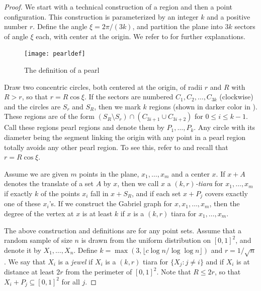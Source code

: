 \documentclass[lotsofwhite,charterfonts]{patmorin}
\begin{document}
\begin{proof}
We start with a technical construction of a region and then a point
configuration.  This construction is parameterized by an integer $k$
and a positive number $r$.  Define the angle $\xi = 2\pi / (3k)$, and
partition the plane into $3k$ sectors of angle $\xi$ each, with center
at the origin.  We refer to  for further explanations.

\begin{figure}[htbp]
\begin{center}\texttt{[image: pearldef]}\end{center}
\caption{The definition of a pearl}
\end{figure}

Draw two concentric circles, both centered at the origin, of radii $r$
and $R$ with $R > r$, so that $r = R \cos \xi$.  If the sectors are
numbered $C_1, C_2, \ldots, C_{3k}$ (clockwise) and the circles are
$S_r$ and $S_R$, then we mark $k$ regions (shown in darker color in
). These regions are of the form $(S_R \setminus S_r) \cap
(C_{3i+1} \cup C_{3i+2})$ for $0 \le i \le k-1$.  Call these regions
pearl regions and denote them by $P_1 , \ldots, P_k$.  Any circle with
its diameter being the segment linking the origin with any point in a
pearl region totally avoids any other pearl region. To see this, refer
to  and recall that $r = R \cos \xi$.

Assume we are given $m$ points in the plane, $x_1,\ldots,x_m$ and a
center $x$.  If $x+A$ denotes the translate of a set $A$ by $x$, then we
call $x$ a \emph{$(k,r)$-tiara} for $x_1 , \ldots , x_m$ if exactly $k$
of the points $x_i$ fall in $x+S_R$, and if each set $x+P_j$ covers
exactly one of these $x_i$'s.  If we construct the Gabriel graph for
$x,x_1,\ldots,x_m$, then the degree of the vertex at $x$ is at least $k$
if $x$ is a $(k,r)$ tiara for $x_1,\ldots,x_m$.

The above construction and definitions are
for any point sets.
Assume that a random sample of size $n$ is drawn
from the uniform distribution on $[0,1]^2$,
and denote it by $X_1 , \ldots, X_n$.
Define $k = \max( 3, \lfloor c \log n / \log \log n \rfloor)$
and $r = 1/\sqrt{n}$.
We say that $X_i$ is a {\it jewel}
if $X_i$ is a $(k,r)$ tiara for $\{ X_j : j \not= i \}$
and if $X_i$ is at distance at least $2r$ from the
perimeter of $[0,1]^2$. Note that $R \le 2r$, so that
$X_i + P_j \subseteq [0,1]^2$ for all $j$.


\end{proof}
\end{document}
